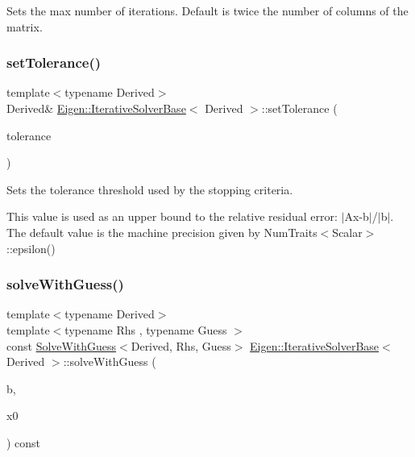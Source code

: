 Sets the max number of iterations. Default is twice the number of columns of the matrix. \mbox{\label{class_eigen_1_1_iterative_solver_base_ac160a444af8998f93da9aa30e858470d}} 
\subsubsection{\texorpdfstring{setTolerance()}{setTolerance()}}
{\footnotesize\ttfamily template$<$typename Derived$>$ \\
Derived\& \mbox{\hyperlink{class_eigen_1_1_iterative_solver_base}{Eigen\+::\+Iterative\+Solver\+Base}}$<$ Derived $>$\+::set\+Tolerance (\begin{DoxyParamCaption}\item[{const Real\+Scalar \&}]{tolerance }\end{DoxyParamCaption})\hspace{0.3cm}{\ttfamily [inline]}}

Sets the tolerance threshold used by the stopping criteria.

This value is used as an upper bound to the relative residual error\+: $\vert$\+Ax-\/b$\vert$/$\vert$b$\vert$. The default value is the machine precision given by Num\+Traits$<$\+Scalar$>$\+::epsilon() \mbox{\label{class_eigen_1_1_iterative_solver_base_adcc18d1ab283786dcbb5a3f63f4b4bd8}} 
\subsubsection{\texorpdfstring{solveWithGuess()}{solveWithGuess()}}
{\footnotesize\ttfamily template$<$typename Derived$>$ \\
template$<$typename Rhs , typename Guess $>$ \\
const \mbox{\hyperlink{class_eigen_1_1_solve_with_guess}{Solve\+With\+Guess}}$<$Derived, Rhs, Guess$>$ \mbox{\hyperlink{class_eigen_1_1_iterative_solver_base}{Eigen\+::\+Iterative\+Solver\+Base}}$<$ Derived $>$\+::solve\+With\+Guess (\begin{DoxyParamCaption}\item[{const \mbox{\hyperlink{class_eigen_1_1_matrix_base}{Matrix\+Base}}$<$ Rhs $>$ \&}]{b,  }\item[{const Guess \&}]{x0 }\end{DoxyParamCaption}) const\hspace{0.3cm}{\ttfamily [inline]}}

